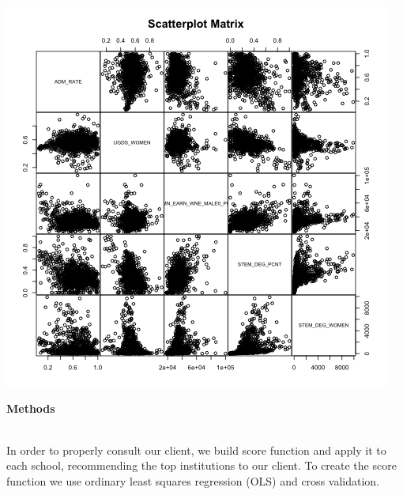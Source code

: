 \documentclass[11pt,english]{article}
\begin{document}
\begin{table}[ht]
\centering
{}
\caption{Correlation Matrix} 
\end{table}
\noindent\includegraphics {../images/scatterplot-matrix.png}


\vspace*{3\baselineskip}

{\large\textbf{Methods}} \\\

In order to properly consult our client, we build score function and apply it to each school, recommending the top institutions to our client. To create the score function we use ordinary least squares regression (OLS) and cross validation. \\\
\end{document}
